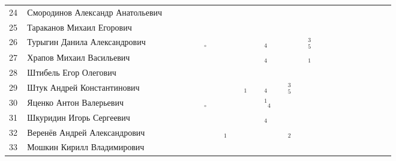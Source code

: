 \documentclass[a4paper,11pt]{article}
\newcommand*\Ok{&\small \ding{51}$\!\!_\circ$} %
\newcommand*\ok{&{\small \ding{51}}} %
\newcommand*\no{&{\small }} %
\newcommand*\da{&{\small\ding{48}$\!\!_1$}} %
\newcommand*\ad{&{\small${}^1\!\!$\ding{48}$\!\!_4$}} %
\newcommand*\db{&{\small\ding{48}$\!\!_2$}} %
\newcommand*\dd{&{\small\ding{48}$\!\!_4$}} %
\newcommand*\ce{&{\small\ding{48}$\!\!^3_5$}} %
\begin{document}
\begin{tabular}{p{7pt}|l|p{6pt}p{6pt}p{6pt}p{6pt}p{6pt}p{6pt}p{6pt}p{6pt}p{6pt}p{6pt}p{6pt}p{6pt}p{6pt}p{6pt}p{6pt}p{6pt}p{6pt}p{6pt}p{6pt}p{6pt}p{6pt}p{6pt}p{6pt}p{6pt}}
24\,&Смородинов Александр Анатольевич	\no\no\no\ok\\
25\,&Тараканов Михаил Егорович		\ok\ok\ok\ok\ok\ok\no\ok\ok\ok\ok\no\no\ok\ok\\
26\,&Турыгин Данила Александрович	\ok\ok\ok\ok\Ok\ok\ok\ok\ok\ok\dd\ok\ok\ok\ce\\
27\,&Храпов Михаил Васильевич		\ok\ok\ok\ok\no\no\ok\ok\ok\ok\dd\ok\ok\ok\da\\
\midrule
28\,&Штибель Егор Олегович		\no\no\ok\\
29\,&Штук Андрей Константинович		\ok\ok\ok\ok\ok\ok\no\ok\da\ok\dd\ok\ce\ok\ok\\
30\,&Яценко Антон Валерьевич		\ok\ok\ok\ok\Ok\no\ok\no\ok\ok\ad\no\no\no\ok\\
31\,&Шкуридин Игорь Сергеевич		\ok\no\ok\ok\ok\ok\ok\ok\no\ok\dd\no\no\no\ok\\
32\,&Веренёв Андрей Александрович	\ok\ok\ok\ok\ok\ok\da\no\ok\ok\ok\ok\db\ok\ok\\
33\,&Мошкин Кирилл Владимирович		\ok\ok\ok\ok\ok\ok\no\ok\ok\ok\no\no\no\no\no\\
\bottomrule
\end{tabular} 
\end{document}

